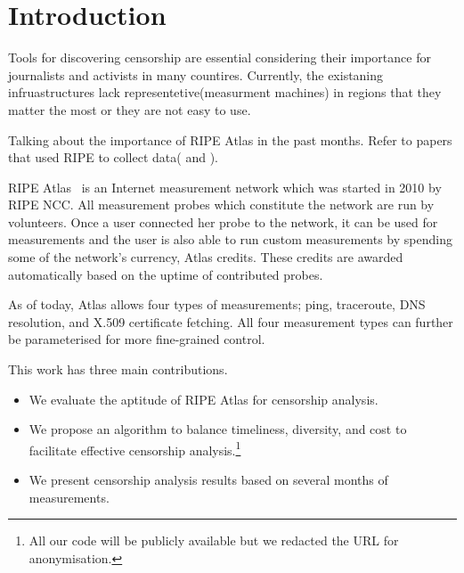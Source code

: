 \section{Introduction}


Tools for discovering censorship are essential considering their importance for journalists and
activists in many countires. Currently, the existaning infruastructures lack representetive(measurment machines) in
regions that they matter the most or they are not easy to use. 

Talking about the importance of RIPE Atlas in the past months. Refer to papers that used RIPE to collect data(\cite{lutu2014understanding} and \cite{brownlee2014searching}).


RIPE Atlas~\cite{atlas} is an Internet measurement network which was started in 2010 by RIPE NCC.
All measurement probes which constitute the network are run by volunteers.  Once a user connected
her probe to the network, it can be used for measurements and the user is also able to run custom
measurements by spending some of the network's currency, Atlas credits.  These credits are awarded
automatically based on the uptime of contributed probes.

As of today, Atlas allows four types of measurements; ping, traceroute, DNS resolution, and X.509
certificate fetching.  All four measurement types can further be parameterised for more fine-grained
control.

This work has three main contributions.
\begin{itemize}
	\item We evaluate the aptitude of RIPE Atlas for censorship analysis.
	\item We propose an algorithm to balance
	timeliness, diversity, and cost to facilitate effective censorship analysis.\footnote{All our
	code will be publicly available but we redacted the URL for anonymisation.}
	\item We present censorship analysis results based on several months of measurements.
\end{itemize}
